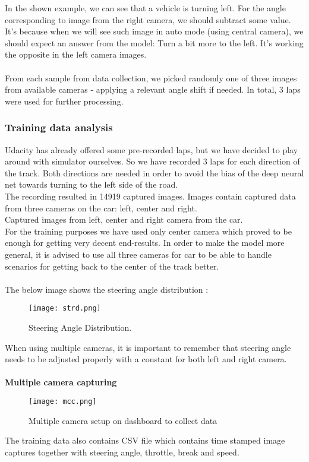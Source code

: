In the shown example, we can see that a vehicle is turning left. For the angle corresponding to image from the right camera, we should subtract some value. It's because when we will see such image in auto mode (using central camera), we should expect an answer from the model: Turn a bit more to the left. It's working the opposite in the left camera images.\\\\
From each sample from data collection, we picked randomly one of three images from available cameras - applying a relevant angle shift if needed. In total, 3 laps were used for further processing.


\subsubsection{Training data analysis}
Udacity has already offered some pre-recorded laps, but we have decided to play around with simulator ourselves. So we have recorded 3 laps for each direction of the track. Both directions are needed in order to avoid the bias of the deep neural net towards turning to the left side of the road.\\
The recording resulted in 14919 captured images. Images contain captured data from three cameras on the car: left, center and right.\\
Captured images from left, center and right camera from the car.\\
For the training purposes we have used only center camera which proved to be enough for getting very decent end-results. In order to make the model more general, it is advised to use all three cameras for car to be able to handle scenarios for getting back to the center of the track better.\\\\
The below image shows the steering angle distribution :\\
\begin{figure}[H]
	\centering
	\texttt{[image: strd.png]}
	\caption{Steering Angle Distribution.}
\end{figure}
When using multiple cameras, it is important to remember that steering angle needs to be adjusted properly with a constant for both left and right camera.\\\\
{\textbf{Multiple camera capturing}}
\begin{figure}[H]
	\centering
	\texttt{[image: mcc.png]}
	\caption{Multiple camera setup on dashboard to collect data}
\end{figure}
The training data also contains CSV file which contains time stamped image captures together with steering angle, throttle, break and speed.

